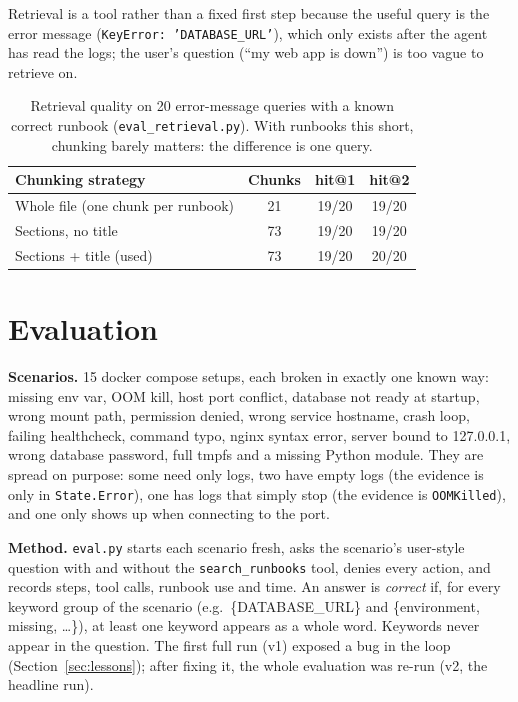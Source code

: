 \documentclass[10pt,a4paper]{article}
\newcommand{\code}[1]{\texttt{#1}}
\begin{document}
Retrieval is a tool rather than a fixed first step because the useful query is the error message
(\code{KeyError: 'DATABASE\_URL'}), which only exists after the agent has read the logs; the
user's question (``my web app is down'') is too vague to retrieve on.

\begin{table}[h]
\centering\small
\begin{tabular}{lccc}
\toprule
Chunking strategy & Chunks & hit@1 & hit@2 \\
\midrule
Whole file (one chunk per runbook) & 21 & 19/20 & 19/20 \\
Sections, no title & 73 & 19/20 & 19/20 \\
Sections + title (used) & 73 & 19/20 & 20/20 \\
\bottomrule
\end{tabular}
\caption{Retrieval quality on 20 error-message queries with a known correct runbook
(\code{eval\_retrieval.py}). With runbooks this short, chunking barely matters: the difference is one query.}
\end{table}

\section{Evaluation}
\textbf{Scenarios.} 15 docker compose setups, each broken in exactly one known way: missing env var,
OOM kill, host port conflict, database not ready at startup, wrong mount path, permission denied,
wrong service hostname, crash loop, failing healthcheck, command typo, nginx syntax error, server
bound to 127.0.0.1, wrong database password, full tmpfs and a missing Python module. They are spread on
purpose: some need only logs, two have empty logs (the evidence is only in \code{State.Error}),
one has logs that simply stop (the evidence is \code{OOMKilled}), and one only shows up when connecting to the port.

\textbf{Method.} \code{eval.py} starts each scenario fresh, asks the scenario's user-style question
with and without the \code{search\_runbooks} tool, denies every action, and records steps, tool
calls, runbook use and time. An answer is \emph{correct} if, for every keyword group of the scenario
(e.g.\ \{DATABASE\_URL\} and \{environment, missing, \dots\}), at least one keyword appears as a whole
word. Keywords never appear in the question. The first full run (v1) exposed a bug in the loop
(Section~\ref{sec:lessons}); after fixing it, the whole evaluation was re-run (v2, the headline run).
\end{document}
